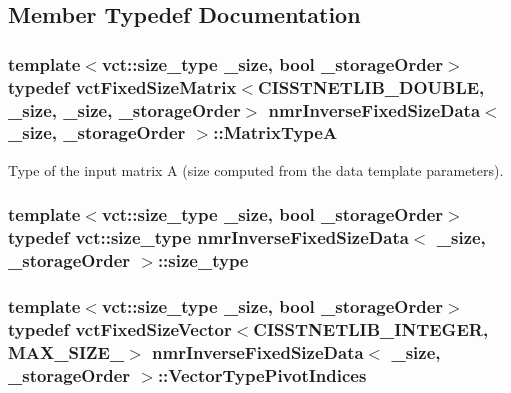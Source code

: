 \subsection{Member Typedef Documentation}
\hypertarget{classnmr_inverse_fixed_size_data_a3ead3c2c221bc42f4717cb0cc0aaa876}{
\subsubsection[{Matrix\-Type\-A}]{\setlength{\rightskip}{0pt plus 5cm}template$<$vct\-::size\-\_\-type \-\_\-size, bool \-\_\-storage\-Order$>$ typedef {\bf vct\-Fixed\-Size\-Matrix}$<$C\-I\-S\-S\-T\-N\-E\-T\-L\-I\-B\-\_\-\-D\-O\-U\-B\-L\-E, \-\_\-size, \-\_\-size, \-\_\-storage\-Order$>$ {\bf nmr\-Inverse\-Fixed\-Size\-Data}$<$ \-\_\-size, \-\_\-storage\-Order $>$\-::{\bf Matrix\-Type\-A}}}\label{classnmr_inverse_fixed_size_data_a3ead3c2c221bc42f4717cb0cc0aaa876}
Type of the input matrix A (size computed from the data template parameters). \hypertarget{classnmr_inverse_fixed_size_data_a45f08ccd7186caa5300f9ff5779e1f76}{
\subsubsection[{size\-\_\-type}]{\setlength{\rightskip}{0pt plus 5cm}template$<$vct\-::size\-\_\-type \-\_\-size, bool \-\_\-storage\-Order$>$ typedef {\bf vct\-::size\-\_\-type} {\bf nmr\-Inverse\-Fixed\-Size\-Data}$<$ \-\_\-size, \-\_\-storage\-Order $>$\-::{\bf size\-\_\-type}}}\label{classnmr_inverse_fixed_size_data_a45f08ccd7186caa5300f9ff5779e1f76}
\hypertarget{classnmr_inverse_fixed_size_data_ac8e0c496927d3fe726116c4c6ddf5af2}{
\subsubsection[{Vector\-Type\-Pivot\-Indices}]{\setlength{\rightskip}{0pt plus 5cm}template$<$vct\-::size\-\_\-type \-\_\-size, bool \-\_\-storage\-Order$>$ typedef {\bf vct\-Fixed\-Size\-Vector}$<$C\-I\-S\-S\-T\-N\-E\-T\-L\-I\-B\-\_\-\-I\-N\-T\-E\-G\-E\-R, {\bf M\-A\-X\-\_\-\-S\-I\-Z\-E\-\_}$>$ {\bf nmr\-Inverse\-Fixed\-Size\-Data}$<$ \-\_\-size, \-\_\-storage\-Order $>$\-::{\bf Vector\-Type\-Pivot\-Indices}}}\label{classnmr_inverse_fixed_size_data_ac8e0c496927d3fe726116c4c6ddf5af2}
